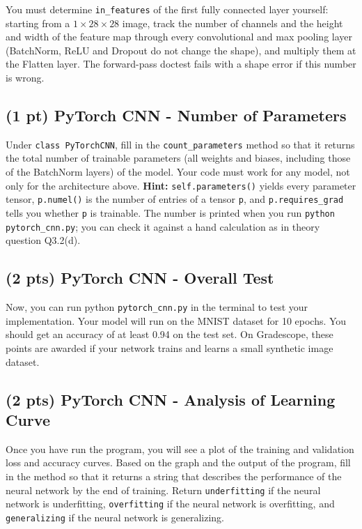 \documentclass[11pt]{exam}
\begin{document}
You must determine \verb|in_features| of the first fully connected layer yourself: starting from a $1 \times 28 \times 28$ image, track the number of channels and the height and width of the feature map through every convolutional and max pooling layer (BatchNorm, ReLU and Dropout do not change the shape), and multiply them at the Flatten layer. The forward-pass doctest fails with a shape error if this number is wrong.

\subsection{(1 pt) PyTorch CNN - Number of Parameters}
Under \verb|class PyTorchCNN|, fill in the \verb|count_parameters| method so that it returns the total number of trainable parameters (all weights and biases, including those of the BatchNorm layers) of the model. Your code must work for any model, not only for the architecture above. \textbf{Hint:} \verb|self.parameters()| yields every parameter tensor, \verb|p.numel()| is the number of entries of a tensor \verb|p|, and \verb|p.requires_grad| tells you whether \verb|p| is trainable. The number is printed when you run \verb|python pytorch_cnn.py|; you can check it against a hand calculation as in theory question Q3.2(d).

\subsection{(2 pts) PyTorch CNN - Overall Test}
Now, you can run python \verb|pytorch_cnn.py| in the terminal to test your implementation. Your model will run on the MNIST dataset for 10 epochs. You should get an accuracy of at least 0.94 on the test set. On Gradescope, these points are awarded if your network trains and learns a small synthetic image dataset.

\subsection{(2 pts) PyTorch CNN - Analysis of Learning Curve}
Once you have run the program, you will see a plot of the training and validation loss and accuracy curves. Based on the graph and the output of the program, fill in the  method so that it returns a string that describes the performance of the neural network by the end of training. Return \verb|underfitting| if the neural network is underfitting, \verb|overfitting| if the neural network is overfitting, and \verb|generalizing| if the neural network is generalizing.
\end{document}
